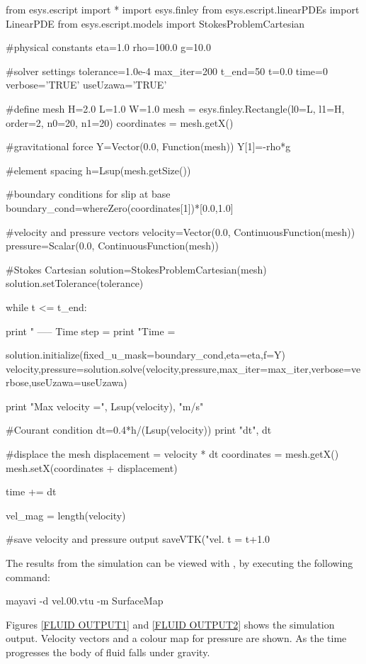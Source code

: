 \begin{python}
from esys.escript import *
import esys.finley
from esys.escript.linearPDEs import LinearPDE
from esys.escript.models import StokesProblemCartesian

#physical constants
eta=1.0
rho=100.0
g=10.0 

#solver settings
tolerance=1.0e-4
max_iter=200
t_end=50
t=0.0
time=0
verbose='TRUE'
useUzawa='TRUE'

#define mesh 
H=2.0
L=1.0
W=1.0
mesh = esys.finley.Rectangle(l0=L, l1=H, order=2, n0=20, n1=20)
coordinates = mesh.getX()

#gravitational force
Y=Vector(0.0, Function(mesh))
Y[1]=-rho*g

#element spacing
h=Lsup(mesh.getSize())

#boundary conditions for slip at base
boundary_cond=whereZero(coordinates[1])*[0.0,1.0]

#velocity and pressure vectors
velocity=Vector(0.0, ContinuousFunction(mesh))
pressure=Scalar(0.0, ContinuousFunction(mesh))

#Stokes Cartesian
solution=StokesProblemCartesian(mesh)
solution.setTolerance(tolerance)

while t <= t_end:

  print " ----- Time step = %
  print "Time = %
 
  solution.initialize(fixed_u_mask=boundary_cond,eta=eta,f=Y)
  velocity,pressure=solution.solve(velocity,pressure,max_iter=max_iter,verbose=verbose,useUzawa=useUzawa)
  
  print "Max velocity =", Lsup(velocity), "m/s"
  
  #Courant condition
  dt=0.4*h/(Lsup(velocity))
  print "dt", dt 
  
  #displace the mesh
  displacement = velocity * dt
  coordinates = mesh.getX()
  mesh.setX(coordinates + displacement)  
  
  time += dt
  
  vel_mag = length(velocity)

  #save velocity and pressure output
  saveVTK("vel.%
  t = t+1.0

\end{python}

The results from the simulation can be viewed with \mayavi, by executing the following command:
%
\begin{python}
mayavi -d vel.00.vtu -m SurfaceMap
\end{python}
%
Figures \ref{FLUID OUTPUT1} and \ref{FLUID OUTPUT2} shows the simulation output. Velocity vectors and a colour map for pressure are shown. As the time progresses the body of fluid falls under gravity. 
 
